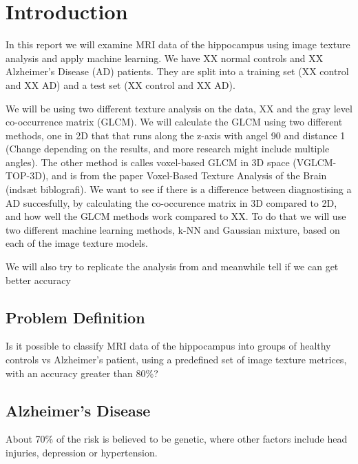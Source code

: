 \chapter{Introduction}

In this report we will examine MRI data of the hippocampus using image texture analysis and apply machine learning. We have XX normal controls and XX Alzheimer's Disease (AD) patients. They are split into a training set (XX control and XX AD) and a test set (XX control and XX AD).

We will be using two different texture analysis on the data, XX and the gray level co-occ\-urren\-ce matrix (GLCM).
We will calculate the GLCM using two different methods, one in 2D that that runs along the z-axis with angel 90 and distance 1 (Change depending on the results, and more research might include multiple angles).\cite{Castellano}
The other method is calles voxel-based GLCM in 3D space (VGLCM-TOP-3D), and is from the paper Voxel-Based Texture Analysis of the Brain (indsæt biblografi).
We want to see if there is a difference between diagnostising a AD succesfully, by calculating the co-occurence matrix in 3D compared to 2D, and how well the GLCM methods work
compared to XX. To do that we will use two different machine learning methods, k-NN and Gaussian mixture, based on each of the image texture models.

We will also try to replicate the analysis from \cite{MRfreeborough} and meanwhile tell if we can get better accuracy


\section{Problem Definition}

Is it possible to classify MRI data of the hippocampus into groups of healthy controls vs Alzheimer's patient, using a predefined set of image texture metrices, with an accuracy great\-er than 80\%?

\section{Alzheimer's Disease}

About 70\% of the risk is believed to be genetic, where other factors include head injuries, depression or hypertension. \cite{Magnetic} 




